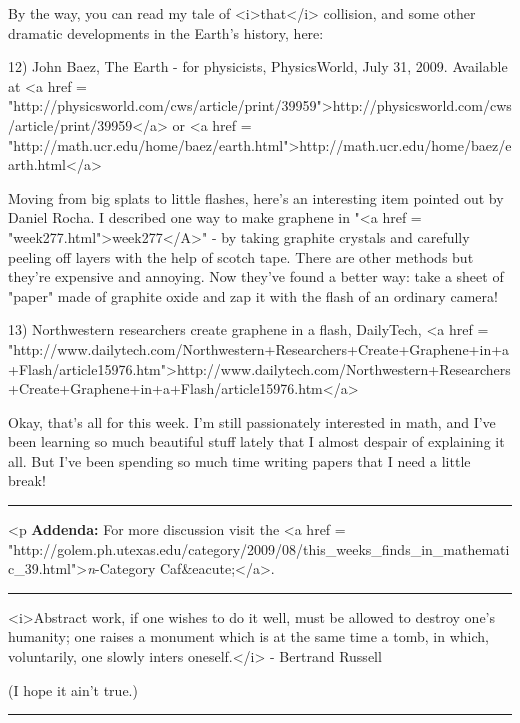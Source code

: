 By the way, you can read my tale of <i>that</i> collision,
and some other dramatic developments in the Earth's history, here:

12) John Baez, The Earth - for physicists, PhysicsWorld, July 31, 2009.
Available at <a href = "http://physicsworld.com/cws/article/print/39959">http://physicsworld.com/cws/article/print/39959</a> or
<a href = "http://math.ucr.edu/home/baez/earth.html">http://math.ucr.edu/home/baez/earth.html</a>

Moving from big splats to little flashes, here's an interesting item
pointed out by Daniel Rocha.  I described one way to make graphene in
"<a href = "week277.html">week277</A>" - by taking graphite
crystals and carefully peeling off layers with the help of scotch
tape.  There are other methods but they're expensive and annoying.
Now they've found a better way: take a sheet of "paper" made
of graphite oxide and zap it with the flash of an ordinary camera!

13) Northwestern researchers create graphene in a flash, DailyTech,
<a href = "http://www.dailytech.com/Northwestern+Researchers+Create+Graphene+in+a+Flash/article15976.htm">http://www.dailytech.com/Northwestern+Researchers+Create+Graphene+in+a+Flash/article15976.htm</a>

Okay, that's all for this week.  I'm still passionately interested in
math, and I've been learning so much beautiful stuff lately that I
almost despair of explaining it all.  But I've been spending so much
time writing papers that I need a little break!  

\par\noindent\rule{\textwidth}{0.4pt}
<p
\textbf{Addenda:} For more discussion visit the <a href =
"http://golem.ph.utexas.edu/category/2009/08/this_weeks_finds_in_mathematic_39.html">\emph{n}-Category
Caf&eacute;</a>.

\par\noindent\rule{\textwidth}{0.4pt}
<i>Abstract work, if one wishes to do it well, must be allowed to destroy
one's humanity; one raises a monument which is at the same time a tomb, 
in which, voluntarily, one slowly inters oneself.</i> - Bertrand Russell

(I hope it ain't true.)

\par\noindent\rule{\textwidth}{0.4pt}

